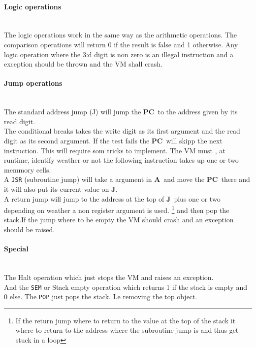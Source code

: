 \documentclass{article}
\newcommand{\V}{\verb}
\newcommand{\A}{$\textbf{A}$}
\newcommand{\pc}{$\textbf{PC}$}
\newcommand{\J}{$\textbf{J}$}
\begin{document}
\paragraph{Logic operations} \
\\
The logic operations work in the same way as the arithmetic operations. The
comparison operations will return 0 if the result is false and 1 otherwise.
Any logic operation where the 3:d digit is non zero is an illegal instruction
and a exception should be thrown and the VM shall crash.

\paragraph{Jump operations} \
\\
The standard address jump (J) will jump the \pc \ to the address given by its
read digit.\\
The conditional breaks takes the write digit as its first argument and the read
digit as its second argument. If the test fails the \pc \ will skipp the next
instruction. This will require som tricks to implement. The VM must , at
runtime, identify weather or not the following instruction takes up one or two
memmory cells.\\

A \V+JSR+ (subroutine jump) will take a argument in \A \ and move the \pc \
there and it will also put its current value on \J.\\
A return jump will jump to the address at the top of \J \ plus one or two
depending on weather a non register argument is used.
 \footnote{If the return jump where to return to the value at the top of the
 stack it where to return to the address where the subroutine jump is and thus 
 get stuck in a loop} and then pop the stack.If the jump where to be empty the 
 VM should crash and an exception should be raised.\\


\paragraph{Special}\
\\
The Halt operation which just stops the VM and
raises an exception.\\
And the \V+SEM+ or Stack empty operation which returns 1 if the stack is empty
and 0 else.
The \V+POP+ just pops the stack. I.e removing the top object.
\end{document}
